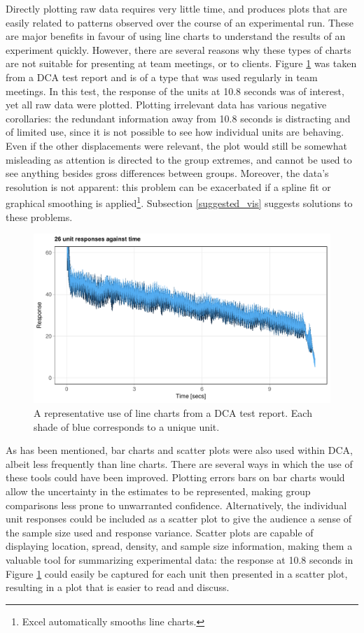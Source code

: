 \documentclass[11pt,a4paper,article]{memoir} %
\begin{document}
Directly plotting raw data requires very little time, and produces plots that are easily related to patterns observed over the course of an experimental run. These are major benefits in favour of using line charts to understand the results of an experiment quickly. However, there are several reasons why these types of charts are not suitable for presenting at team meetings, or to clients. Figure \ref{fig:line_chart} was taken from a DCA test report and is of a type that was used regularly in team meetings. In this test, the response of the units at 10.8 seconds was of interest, yet all raw data were plotted. Plotting irrelevant data has various negative corollaries: the redundant information away from 10.8 seconds is distracting and of limited use, since it is not possible to see how individual units are behaving.  Even if the other displacements were relevant, the plot would still be somewhat misleading as attention is directed to the group extremes, and cannot be used to see anything besides gross differences between groups. Moreover, the data's resolution is not apparent: this problem can be exacerbated if a spline fit or graphical smoothing is applied\footnote{Excel automatically smooths line charts.}. Subsection \ref{suggested_vis} suggests solutions to these problems.
\begin{figure}[h!]
\includegraphics[width=\textwidth]{imitation_line_chart_2.pdf}
\caption{A representative use of line charts from a DCA test report. Each shade of blue corresponds to a unique unit.}
\label{fig:line_chart}
\end{figure}

As has been mentioned, bar charts and scatter plots were also used within DCA, albeit less frequently than line charts. There are several ways in which the use of these tools could have been improved. Plotting errors bars on bar charts would allow the uncertainty in the estimates to be represented, making group comparisons less prone to unwarranted confidence. Alternatively, the individual unit responses could be included as a scatter plot to give the audience a sense of the sample size used and response variance. Scatter plots are capable of displaying location, spread, density, and sample size information, making them a valuable tool for summarizing experimental data: the response at 10.8 seconds in Figure \ref{fig:line_chart} could easily be captured for each unit then presented in a scatter plot, resulting in a plot that is easier to read and discuss.
\end{document}
